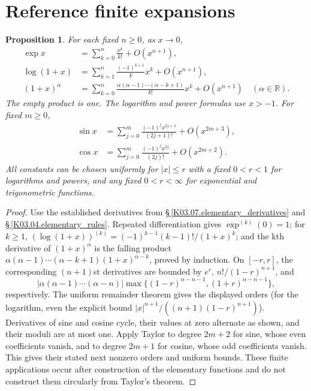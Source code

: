 \documentclass[11pt,oneside,a4paper]{book}
\newtheorem{proposition}[theorem]{Proposition}
\theoremstyle{definition}
\theoremstyle{remark}
\newcommand{\R}{\mathbb R}
\newcommand{\KEntry}[2]{\Needspace{7\baselineskip}\section{#2}\label{#1}{\small\sffamily\color{black!60}\detokenize{#1}}\par}
\newcommand{\KRef}[1]{\hyperref[#1]{\S\,\ref*{#1}}}
\begin{document}
\KEntry{K03.06.reference_expansions}{Reference finite expansions}
\begin{proposition}
For each fixed $n\ge0$, as $x\to0$,
\begin{align*}
\exp x&=\sum_{k=0}^n\frac{x^k}{k!}+O(x^{n+1}),\\
\log(1+x)&=\sum_{k=1}^n\frac{(-1)^{k+1}}k x^k+O(x^{n+1}),\\
(1+x)^\alpha&=\sum_{k=0}^n\frac{\alpha(\alpha-1)\cdots(\alpha-k+1)}{k!}x^k+O(x^{n+1})\quad(\alpha\in\R).
\end{align*}
The empty product is one. The logarithm and power formulas use $x>-1$. For fixed $m\ge0$,
\begin{align*}
\sin x&=\sum_{j=0}^m\frac{(-1)^jx^{2j+1}}{(2j+1)!}+O(x^{2m+3}),\\
\cos x&=\sum_{j=0}^m\frac{(-1)^jx^{2j}}{(2j)!}+O(x^{2m+2}).
\end{align*}
All constants can be chosen uniformly for $|x|\le r$ with a fixed $0<r<1$ for logarithms and powers, and any fixed $0<r<\infty$ for exponential and trigonometric functions.
\end{proposition}
\begin{proof}
Use the established derivatives from \KRef{K03.07.elementary_derivatives} and \KRef{K03.04.elementary_rules}. Repeated differentiation gives $\exp^{(k)}(0)=1$; for $k\ge1$, $(\log(1+x))^{(k)}=(-1)^{k-1}(k-1)!/(1+x)^k$; and the kth derivative of $(1+x)^\alpha$ is the falling product $\alpha(\alpha-1)\cdots(\alpha-k+1)(1+x)^{\alpha-k}$, proved by induction. On $[-r,r]$, the corresponding $(n+1)$st derivatives are bounded by $e^r$, $n!/(1-r)^{n+1}$, and
\[ |\alpha(\alpha-1)\cdots(\alpha-n)|\max\{(1-r)^{\alpha-n-1},(1+r)^{\alpha-n-1}\}, \]
respectively. The uniform remainder theorem gives the displayed orders (for the logarithm, even the explicit bound $|x|^{n+1}/((n+1)(1-r)^{n+1})$). Derivatives of sine and cosine cycle, their values at zero alternate as shown, and their moduli are at most one. Apply Taylor to degree $2m+2$ for sine, whose even coefficients vanish, and to degree $2m+1$ for cosine, whose odd coefficients vanish. This gives their stated next nonzero orders and uniform bounds. These finite applications occur after construction of the elementary functions and do not construct them circularly from Taylor's theorem.
\end{proof}
\end{document}
